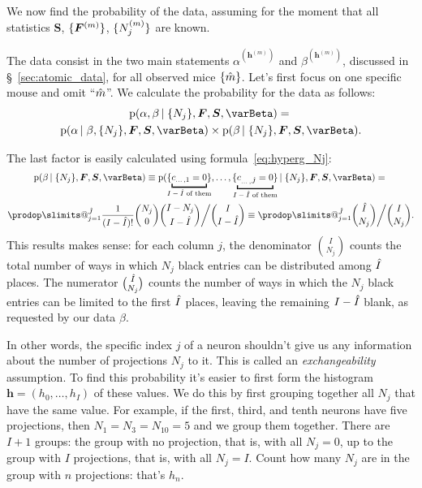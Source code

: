 \documentclass[\ifafour a4paper,12pt,\else a5paper,10pt,\fi%
onecolumn,oneside,article,%
british%
]{memoir}
\makeatletter
\theoremstyle{remark}
\theoremstyle{innote}
\def\prod{\DOTSI\prodop\slimits@}
\newcommand*{\pf}{\mathrm{p}}%
\renewcommand*{\|}[1][]{\nonscript\,#1\vert\nonscript\;\mathopen{}}
\newcommand*{\sect}{\S}%
\newcommand*{\yI}{\varBeta}
\newcommand*{\yF}{\bm{F}}
\newcommand*{\yFm}[1][m]{\yF^{(#1)}}
\newcommand*{\yh}{\bm{h}}
\newcommand*{\yhm}[1][m]{\yh^{(#1)}}
\newcommand*{\yNm}[1][m]{N^{(#1)}}
\newcommand*{\ySS}{S}
\newcommand*{\yS}{\bm{\ySS}}
\DeclarePairedDelimiter\tu{\{}{\}}
\newcommand*{\ymh}{\Hat{m}}
\newcommand*{\yIh}{\Hat{I}}
\newcommand*{\yJh}{\Hat{J}}
\newcommand*{\ka}{\alpha}
\newcommand*{\kb}{\beta}
\newcommand*{\kam}[1][\yhm]{\ka^{(#1)}}
\newcommand*{\kbm}[1][\yhm]{\kb^{(#1)}}
\makeatother
\begin{document}
\medskip

We now find the probability of the data, assuming for the moment that all
statistics $\yS$, $\tu{\yFm}$, $\tu{\yNm_{j}}$ are known.

The data consist in the two main statements $\kam$ and $\kbm$, discussed in
\sect~\ref{sec:atomic_data}, for all observed mice $\tu{\ymh}$. Let's first
focus on one specific mouse and omit \enquote{$\ymh$}. We calculate the
probability for the data as follows:
\begin{multline}
  \label{eq:alph_beta_given_stats}
  \pf( \ka,\kb \|\tu{N_{j}},  \yF, \yS, \yI) ={}\\
  \pf( \ka \|\kb, \tu{N_{j}},  \yF, \yS, \yI) \times
    \pf( \kb \|\tu{N_{j}},  \yF, \yS, \yI).
\end{multline}

The last factor is easily calculated using formula~\eqref{eq:hyperg_Nj}:
\begin{multline}
  \label{eq:kb_given_stats}
  \pf( \kb \|\tu{N_{j}},  \yF, \yS, \yI) \equiv
  \pf(\tu{\underbracket{c_{\dotso,1}=0}_{\mathclap{\text{$I-\yIh$ of them}}}},
  \dotsc,
  \tu{\underbracket{c_{\dotso,\yJh}=0}_{\mathclap{\text{$I-\yIh$ of them}}}}
  \|\tu{N_{j}},  \yF, \yS, \yI)
  ={}\\
  \prod_{j=1}^{\yJh}
  \frac{1}{(I-\yIh)!}  \binom{N_{j}}{0}\binom{I-N_{j}}{I-\yIh}
  \bigg/ \binom{I}{I-\yIh}
  \equiv
  \prod_{j=1}^{\yJh}
\binom{\yIh}{N_{j}}\bigg/ \binom{I}{N_{j}}.  
\end{multline}
This results makes sense: for each column $j$, the denominator
$\binom{I}{N_{j}}$ counts the total number of ways in which $N_{j}$ black
entries can be distributed among $\yIh$ places. The numerator
$\binom{\yIh}{N_{j}}$ counts the number of ways in which the $N_{j}$ black
entries can be limited to the first $\yIh$ places, leaving the remaining
$I-\yIh$ blank, as requested by our data $\kb$.



\clearpage

\bigskip


In other words, the specific index $j$
of a neuron shouldn't give us any information about the number of
projections $N_{j}$ to it. This is called an \emph{exchangeability}
assumption. To find this probability it's easier to first form the
histogram $\yh=(h_{0},\dotsc,h_{I})$ of these values. We do this by first
grouping together all $N_{j}$ that have the same value. For example, if the
first, third, and tenth neurons have five projections, then
$N_{1}=N_{3}=N_{10}=5$ and we group them together. There are $I+1$ groups:
the group with no projection, that is, with all $N_{j}=0$, up to the group
with $I$ projections, that is, with all $N_{j}=I$. Count how many $N_{j}$
are in the group with $n$ projections: that's $h_{n}$.
\end{document}

